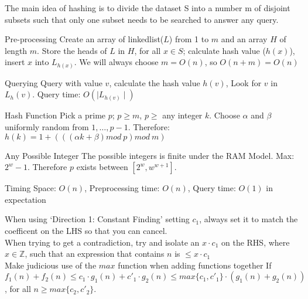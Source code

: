 \documentclass{lecture}
\begin{document}
\begin{landscape}
\begin{multicols}{3}
    \begin{note}{}
        The main idea of hashing is to divide the dataset S into a number m of disjoint subsets such that only one subset needs to be searched to answer any query.
    \end{note}
    \vfill
    \begin{note}{Pre-processing}
        Create an array of linkedlist($L$) from 1 to $m$ and an array $H$ of length $m$. Store the heads of $L$ in $H$, for all $x\in S$; calculate hash value ($h(x)$), insert $x$ into $L_{h(x)}$. We will always choose $m=O(n)$, so $O(n+m)=O(n)$
    \end{note}
    \vfill
    \begin{note}{Querying}
        Query with value $v$, calculate the hash value $h(v)$, Look for $v$ in $L_h(v)$. Query time: $O(\mid L_{h(v)}\mid)$
    \end{note}
    \vfill
    \begin{note}{Hash Function}
        Pick a prime $p$; $p\geq m$, $p\geq$ any integer $k$. Choose $\alpha$ and $\beta$ uniformly random from $1,\ldots,p-1$. Therefore: $h(k)=1+(((\alpha k+\beta)mod\ p)mod\ m)$
    \end{note}
    \vfill
    \begin{note}{Any Possible Integer}
        The possible integers is finite under the RAM Model. Max: $2^w-1$. Therefore $p$ exists between $[2^w,w^{w+1}]$.
    \end{note}
    \vfill
    \begin{note}{Timing}
        Space: $O(n)$, Preprocessing time: $O(n)$, Query time: $O(1)$ in expectation
    \end{note}
    \vfill

    \begin{note}{}
        When using `Direction 1: Constant Finding' setting $c_1$, always set it to match the coefficent on the LHS so that you can cancel.\\
        When trying to get a contradiction, try and isolate an $x \cdot c_1$ on the RHS, where $x \in \mathbb{Z}$, such that an expression that contains $n$ is $\leqslant x \cdot c_1$\\
        Make judicious use of the $max$ function when adding functions together
        If $f_1(n) + f_2(n) \leqslant c_1 \cdot g_1(n) +c'_1 \cdot g_2(n) \leqslant max\{c_1 , c'_1 \} \cdot (g_1(n) + g_2(n))$, for all $n \geqslant max\{c_2, c'_2\}$.\\
    \end{note}
    \vfill


\end{multicols}
\end{landscape}
\end{document}
